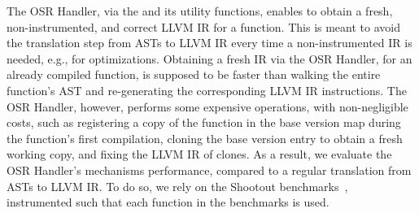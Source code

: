 

The OSR Handler, via the  and its utility functions, enables to obtain a fresh, non-instrumented, and correct LLVM IR for a function.
This is meant to avoid the translation step from ASTs to LLVM IR every time a non-instrumented IR is needed, e.g., for optimizations.
Obtaining a fresh IR via the OSR Handler, for an already compiled function, is supposed to be faster than walking the entire function's AST and re-generating the corresponding LLVM IR instructions.
The OSR Handler, however, performs some expensive operations, with non-negligible costs, such as registering a copy of the function in the base version map during the function's first compilation, cloning the base version entry to obtain a fresh working copy, and fixing the LLVM IR of clones.
As a result, we evaluate the OSR Handler's mechanisms performance, compared to a regular translation from ASTs to LLVM IR.
To do so, we rely on the Shootout benchmarks~\cite{Shootout}, instrumented such that each function in the benchmarks is used.\\

